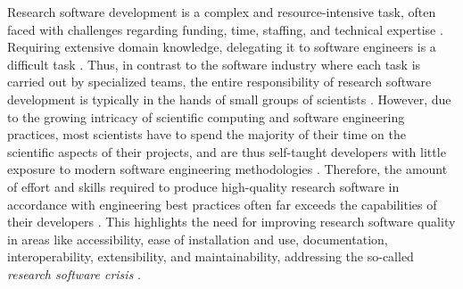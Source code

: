 \documentclass{article}
\begin{document}
Research software development is a complex and resource-intensive task, often faced with challenges regarding funding, time, staffing, and technical expertise \cite{HowToSupportOpenSource, ManagingChaos, BetterSoftwareBetterResearch, SoftDevEnvForSciSoft}. Requiring extensive domain knowledge, delegating it to software engineers is a difficult task \cite{SomeChallengesFacingSoftEngsDevSoftForSci, ChallengesFacingSoftEngInSci, WhenEngineersMetScientists}. Thus, in contrast to the software industry where each task is carried out by specialized teams, the entire responsibility of research software development is typically in the hands of small groups of scientists \cite{AnalyzingGitHubRepoOfPapers, HowScientistsReallyUseComputers, NamingThePainInDevSciSoft}. However, due to the growing intricacy of scientific computing and software engineering practices, most scientists have to spend the majority of their time on the scientific aspects of their projects, and are thus self-taught developers with little exposure to modern software engineering methodologies \cite{SoftwareChasm, SciCompGridlock, WheresTheRealBottleneck, SelfPerceptions, SurveySEPracticesInScience2, HowScientistsDevSciSoftExternalRepl}. Therefore, the amount of effort and skills required to produce high-quality research software in accordance with engineering best practices often far exceeds the capabilities of their developers \cite{SoftEngForCompSci, AdoptingSoftEngConceptsInSciResearch, BridgingTheChasm, SurveySEPracticesInScience, HowScientistsDevAndUseSciSoft, UnderstandingHPCCommunity, ProblemsOfEndUserDevs}. This highlights the need for improving research software quality in areas like accessibility, ease of installation and use, documentation, interoperability, extensibility, and maintainability, addressing the so-called \textit{research software crisis} \cite{TroublingTrendsInSciSoftware, ReprodResearchInCompSci, ReproducibleResearchForSciComp, AccessibleReproducibleResearch, SciSoftwareExtensibility, CompSciError, SciSoftwareAccuracy, ExtensibilityAndLibrarization, ShiningLight, TExperiments, WhyJohnnyCantBuild, ImprovingScienceThatUsesCode}.
\end{document}
